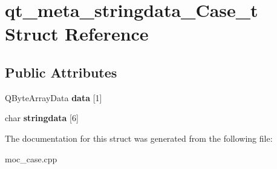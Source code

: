 \hypertarget{structqt__meta__stringdata__Case__t}{\section{qt\+\_\+meta\+\_\+stringdata\+\_\+\+Case\+\_\+t Struct Reference}
\label{structqt__meta__stringdata__Case__t}
}
\subsection*{Public Attributes}
\begin{DoxyCompactItemize}
\item 
\hypertarget{structqt__meta__stringdata__Case__t_a6f3a1b9b3e1fac94a6b966e7074dc7d9}{Q\+Byte\+Array\+Data {\bfseries data} \mbox{[}1\mbox{]}}\label{structqt__meta__stringdata__Case__t_a6f3a1b9b3e1fac94a6b966e7074dc7d9}

\item 
\hypertarget{structqt__meta__stringdata__Case__t_afd1a2b5ae2084283aa5cea8842791b41}{char {\bfseries stringdata} \mbox{[}6\mbox{]}}\label{structqt__meta__stringdata__Case__t_afd1a2b5ae2084283aa5cea8842791b41}

\end{DoxyCompactItemize}


The documentation for this struct was generated from the following file\+:\begin{DoxyCompactItemize}
\item 
moc\+\_\+case.\+cpp\end{DoxyCompactItemize}
